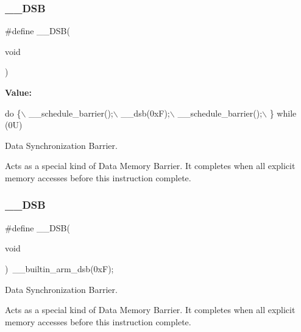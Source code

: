 \subsubsection{\texorpdfstring{\+\_\+\+\_\+\+D\+SB}{\_\_DSB}\hspace{0.1cm}{\footnotesize\ttfamily [1/2]}}
{\footnotesize\ttfamily \#define \+\_\+\+\_\+\+D\+SB(\begin{DoxyParamCaption}\item[{}]{void }\end{DoxyParamCaption})}

{\bfseries Value\+:}
\begin{DoxyCode}
\textcolor{keywordflow}{do} \{\(\backslash\)
                   \_\_schedule\_barrier();\(\backslash\)
                   \_\_dsb(0xF);\(\backslash\)
                   \_\_schedule\_barrier();\(\backslash\)
                \} \textcolor{keywordflow}{while} (0U)
\end{DoxyCode}


Data Synchronization Barrier. 

Acts as a special kind of Data Memory Barrier. It completes when all explicit memory accesses before this instruction complete. \mbox{\label{group___c_m_s_i_s___core___instruction_interface_ga067d257a2b34565410acefb5afef2203}} 
\subsubsection{\texorpdfstring{\+\_\+\+\_\+\+D\+SB}{\_\_DSB}\hspace{0.1cm}{\footnotesize\ttfamily [2/2]}}
{\footnotesize\ttfamily \#define \+\_\+\+\_\+\+D\+SB(\begin{DoxyParamCaption}\item[{}]{void }\end{DoxyParamCaption})~\+\_\+\+\_\+builtin\+\_\+arm\+\_\+dsb(0x\+F);}



Data Synchronization Barrier. 

Acts as a special kind of Data Memory Barrier. It completes when all explicit memory accesses before this instruction complete. \mbox{\label{group___c_m_s_i_s___core___instruction_interface_gaad233022e850a009fc6f7602be1182f6}} 
